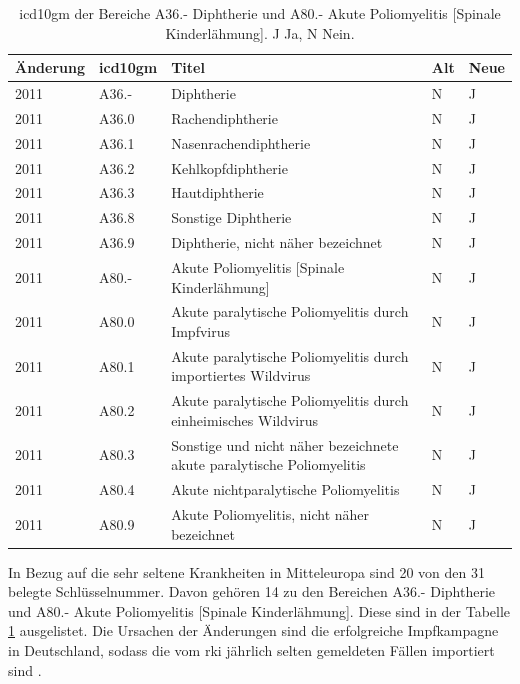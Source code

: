 \begin{table}[ht]
	\centering
	\caption[Seltene Krankheiten in Mitteleuropa]{\ac{icd10gm} der Bereiche \textsf{A36.-} \textsf{Diphtherie} und \textsf{A80.-} \textsf{Akute Poliomyelitis [Spinale Kinderlähmung]}. \textsf{J} Ja, \textsf{N} Nein.}
	\label{tab:icdeuropa}
	\begin{tabular}{|l|l|p{8cm}|l|l|}
		\hline
		\rowcolor{lightgray} Änderung & \ac{icd10gm} & Titel & Alt & Neue \\ \hline
		2011 & A36.- & Diphtherie & N & J \\ \hline
		2011 & A36.0 & Rachendiphtherie & N & J \\ \hline
		2011 & A36.1 & Nasenrachendiphtherie & N & J \\ \hline
		2011 & A36.2 & Kehlkopfdiphtherie & N & J \\ \hline
		2011 & A36.3 & Hautdiphtherie & N & J \\ \hline
		2011 & A36.8 & Sonstige Diphtherie & N & J \\ \hline
		2011 & A36.9 & Diphtherie, nicht näher bezeichnet & N & J \\ \hline
		2011 & A80.- & Akute Poliomyelitis [Spinale Kinderlähmung] & N & J \\ \hline
		2011 & A80.0 & Akute paralytische Poliomyelitis durch Impfvirus & N & J \\ \hline
		2011 & A80.1 & Akute paralytische Poliomyelitis durch importiertes Wildvirus & N & J \\ \hline
		2011 & A80.2 & Akute paralytische Poliomyelitis durch einheimisches Wildvirus & N & J \\ \hline
		2011 & A80.3 & Sonstige und nicht näher bezeichnete akute paralytische Poliomyelitis & N & J \\ \hline
		2011 & A80.4 & Akute nichtparalytische Poliomyelitis & N & J \\ \hline
		2011 & A80.9 & Akute Poliomyelitis, nicht näher bezeichnet & N & J \\ \hline
	\end{tabular}
\end{table}


In Bezug auf die sehr seltene Krankheiten in Mitteleuropa sind \textsf{20} von den \textsf{31} belegte Schlüsselnummer. Davon gehören \textsf{14} zu den Bereichen \textsf{A36.-} \textsf{Diphtherie} und \textsf{A80.-} \textsf{Akute Poliomyelitis [Spinale Kinderlähmung]}. Diese sind in der Tabelle \ref{tab:icdeuropa} ausgelistet. Die Ursachen der Änderungen sind die erfolgreiche Impfkampagne in Deutschland, sodass die vom \ac{rki} jährlich selten gemeldeten Fällen importiert sind \cite{dippol1}.

